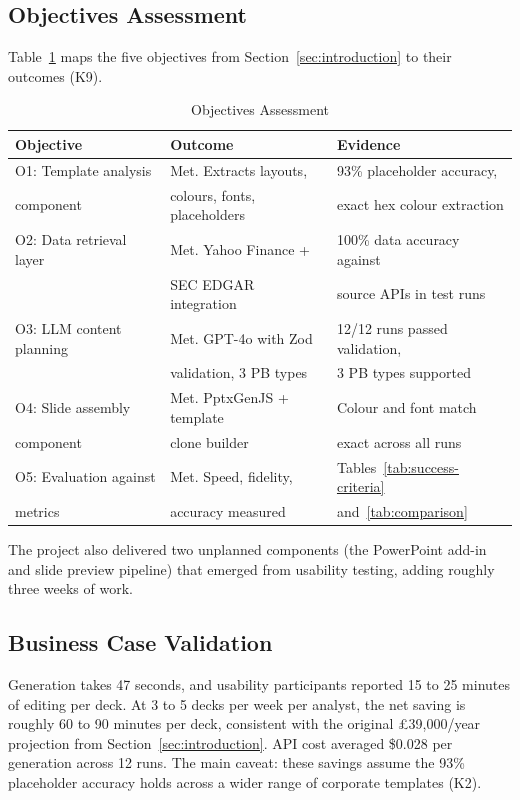 \subsection{Objectives Assessment}

Table~\ref{tab:objectives} maps the five objectives from Section~\ref{sec:introduction} to their outcomes (K9).

\begin{table}[H]
\centering
\begin{tabular}{|l|l|l|}
\hline
\rowcolor{gray!20} \textbf{Objective} & \textbf{Outcome} & \textbf{Evidence} \\
\hline
O1: Template analysis & Met. Extracts layouts, & 93\% placeholder accuracy, \\
component & colours, fonts, placeholders & exact hex colour extraction \\
\hline
O2: Data retrieval layer & Met. Yahoo Finance + & 100\% data accuracy against \\
 & SEC EDGAR integration & source APIs in test runs \\
\hline
O3: LLM content planning & Met. GPT-4o with Zod & 12/12 runs passed validation, \\
 & validation, 3 PB types & 3 PB types supported \\
\hline
O4: Slide assembly & Met. PptxGenJS + template & Colour and font match \\
component & clone builder & exact across all runs \\
\hline
O5: Evaluation against & Met. Speed, fidelity, & Tables~\ref{tab:success-criteria} \\
metrics & accuracy measured & and~\ref{tab:comparison} \\
\hline
\end{tabular}
\caption{Objectives Assessment}
\label{tab:objectives}
\end{table}

The project also delivered two unplanned components (the PowerPoint add-in and slide preview pipeline) that emerged from usability testing, adding roughly three weeks of work.

\subsection{Business Case Validation}

Generation takes 47 seconds, and usability participants reported 15 to 25 minutes of editing per deck. At 3 to 5 decks per week per analyst, the net saving is roughly 60 to 90 minutes per deck, consistent with the original \pounds 39,000/year projection from Section~\ref{sec:introduction}. API cost averaged \$0.028 per generation across 12 runs. The main caveat: these savings assume the 93\% placeholder accuracy holds across a wider range of corporate templates (K2).

